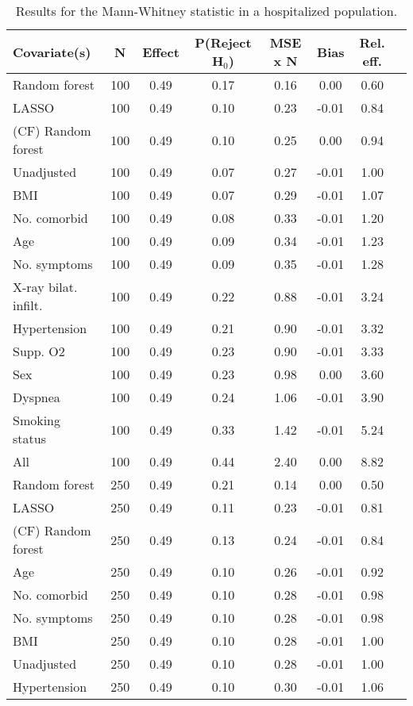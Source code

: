 \documentclass{article}
\begin{document}
{\tabcolsep=6pt  %
\begin{longtable}{lccccccc}
\caption{Results for the Mann-Whitney statistic in a hospitalized population.} \\
Covariate(s) & N & Effect & P(Reject H$_0$) & MSE x N & Bias & Rel. eff.\\ \midrule
Random forest & 100 & 0.49 & 0.17 & 0.16 &  0.00 & 0.60 \\ 
LASSO & 100 & 0.49 & 0.10 & 0.23 & -0.01 & 0.84 \\ 
(CF) Random forest & 100 & 0.49 & 0.10 & 0.25 &  0.00 & 0.94 \\ 
Unadjusted & 100 & 0.49 & 0.07 & 0.27 & -0.01 & 1.00 \\ 
BMI & 100 & 0.49 & 0.07 & 0.29 & -0.01 & 1.07 \\ 
No. comorbid & 100 & 0.49 & 0.08 & 0.33 & -0.01 & 1.20 \\ 
Age & 100 & 0.49 & 0.09 & 0.34 & -0.01 & 1.23 \\ 
No. symptoms & 100 & 0.49 & 0.09 & 0.35 & -0.01 & 1.28 \\ 
X-ray bilat. infilt. & 100 & 0.49 & 0.22 & 0.88 & -0.01 & 3.24 \\ 
Hypertension & 100 & 0.49 & 0.21 & 0.90 & -0.01 & 3.32 \\ 
Supp. O2 & 100 & 0.49 & 0.23 & 0.90 & -0.01 & 3.33 \\ 
Sex & 100 & 0.49 & 0.23 & 0.98 &  0.00 & 3.60 \\ 
Dyspnea & 100 & 0.49 & 0.24 & 1.06 & -0.01 & 3.90 \\ 
Smoking status & 100 & 0.49 & 0.33 & 1.42 & -0.01 & 5.24 \\ 
All & 100 & 0.49 & 0.44 & 2.40 &  0.00 & 8.82 \\ \midrule() 
Random forest & 250 & 0.49 & 0.21 & 0.14 &  0.00 & 0.50 \\ 
LASSO & 250 & 0.49 & 0.11 & 0.23 & -0.01 & 0.81 \\ 
(CF) Random forest & 250 & 0.49 & 0.13 & 0.24 & -0.01 & 0.84 \\ 
Age & 250 & 0.49 & 0.10 & 0.26 & -0.01 & 0.92 \\ 
No. comorbid & 250 & 0.49 & 0.10 & 0.28 & -0.01 & 0.98 \\ 
No. symptoms & 250 & 0.49 & 0.10 & 0.28 & -0.01 & 0.98 \\ 
BMI & 250 & 0.49 & 0.10 & 0.28 & -0.01 & 1.00 \\ 
Unadjusted & 250 & 0.49 & 0.10 & 0.28 & -0.01 & 1.00 \\ 
Hypertension & 250 & 0.49 & 0.10 & 0.30 & -0.01 & 1.06 \\ 

\end{longtable}}
\end{document}
